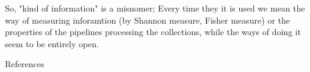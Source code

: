 \documentclass[10pt, aspectratio=169, handout]{beamer}
\begin{document}
\begin{frame}

    So, "kind of information" is a misnomer;
    Every time they it is used we mean  the way of measuring inforamtion (by Shannon measure, Fisher measure)  or the properties of the pipelines processing the collections, while the ways of doing it seem to be entirely open.

    

\end{frame}



    \begin{frame}[label=references]{References}
   \small
        \printbibliography
    \end{frame}



        
\end{document}
